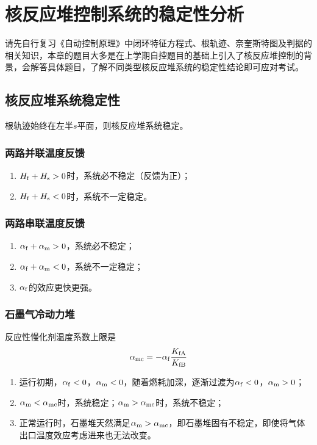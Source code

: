 \section{核反应堆控制系统的稳定性分析}

请先自行复习《自动控制原理》中闭环特征方程式、根轨迹、奈奎斯特图及判据的相关知识，本章的题目大多是在上学期自控题目的基础上引入了核反应堆控制的背景，会解答具体题目，了解不同类型核反应堆系统的稳定性结论即可应对考试。

\subsection{核反应堆系统稳定性}

根轨迹始终在左半$s$平面，则核反应堆系统稳定。

\subsubsection{两路并联温度反馈}

\begin{enumerate}
    \item $H_{\rm f} + H_{\rm s} > 0$时，系统必不稳定（反馈为正）；
    \item $H_{\rm f} + H_{\rm s} < 0$时，系统不一定稳定。
\end{enumerate}

\subsubsection{两路串联温度反馈}

\begin{enumerate}
    \item $\alpha_{\rm f} + \alpha_{\rm m} > 0$，系统必不稳定；
    \item $\alpha_{\rm f} + \alpha_{\rm m} < 0$，系统不一定稳定；
    \item $\alpha_{\rm f}$的效应更快更强。
\end{enumerate}

\subsubsection{石墨气冷动力堆}

反应性慢化剂温度系数上限是
\begin{equation}
    \alpha_{\rm mc} = -\alpha_{\rm f}\frac{K_{\rm fA}}{K_{\rm fB}}
\end{equation}

\begin{enumerate}
    \item 运行初期，$\alpha_{\rm f} < 0$，$\alpha_{\rm m} < 0$，随着燃耗加深，逐渐过渡为$\alpha_{\rm f} < 0$，$\alpha_{\rm m} > 0$；
    \item $\alpha_{\rm m} < \alpha_{\rm mc}$时，系统稳定；$\alpha_{\rm m} > \alpha_{\rm mc}$时，系统不稳定；
    \item 正常运行时，石墨堆天然满足$\alpha_{\rm m} > \alpha_{\rm mc}$，即石墨堆固有不稳定，即使将气体出口温度效应考虑进来也无法改变。
\end{enumerate}

